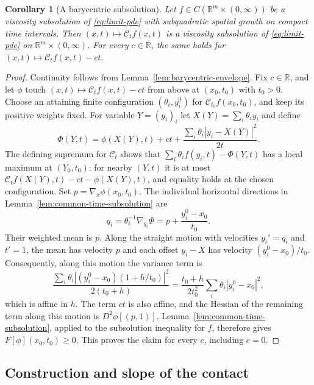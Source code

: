 \documentclass[11pt]{article}
\numberwithin{equation}{section}
\newtheorem{corollary}[theorem]{Corollary}
\theoremstyle{definition}
\theoremstyle{remark}
\newcommand{\R}{\mathbb{R}}
\newcommand{\Cenv}{\mathcal{C}}
\begin{document}
\begin{corollary}[A barycentric subsolution]\label{cor:barycentric-subsolution}
Let $f\in C(\R^m\times(0,\infty))$ be a viscosity subsolution of
\eqref{eq:limit-pde} with subquadratic spatial growth on compact time
intervals. Then $(x,t)\mapsto\Cenv_t f(x,t)$ is a viscosity subsolution of
\eqref{eq:limit-pde} on $\R^m\times(0,\infty)$. For every $c\in\R$, the same
holds for $(x,t)\mapsto\Cenv_t f(x,t)-ct$.
\end{corollary}

\begin{proof}
Continuity follows from Lemma~\ref{lem:barycentric-envelope}. Fix $c\in\R$,
and let $\phi$ touch $(x,t)\mapsto\Cenv_t f(x,t)-ct$ from above at
$(x_0,t_0)$ with $t_0>0$. Choose an attaining finite configuration
$(\theta_i,y_i^0)$ for $\Cenv_{t_0}f(x_0,t_0)$, and keep its positive weights
fixed. For variable $Y=(y_i)_i$ let $X(Y)=\sum_i\theta_i y_i$ and define
\[
  \Phi(Y,t)=\phi(X(Y),t)+ct
              +\frac{\sum_i\theta_i|y_i-X(Y)|^2}{2t}.
\]
The defining supremum for $\Cenv_t$ shows that
$\sum_i\theta_i f(y_i,t)-\Phi(Y,t)$ has a local maximum at $(Y_0,t_0)$:
for nearby $(Y,t)$ it is at most
$\Cenv_t f(X(Y),t)-ct-\phi(X(Y),t)$, and equality holds at the chosen
configuration. Set $p=\nabla_x\phi(x_0,t_0)$. The individual horizontal
directions in Lemma~\ref{lem:common-time-subsolution} are
\[
  q_i=\theta_i^{-1}\nabla_{y_i}\Phi
       =p+\frac{y_i^0-x_0}{t_0}.
\]
Their weighted mean is $p$. Along the straight motion with velocities
$y_i'=q_i$ and $t'=1$, the mean has velocity $p$ and each offset $y_i-X$
has velocity $(y_i^0-x_0)/t_0$. Consequently, along this motion the variance
term is
\[
  \frac{\sum_i\theta_i
           |(y_i^0-x_0)(1+h/t_0)|^2}{2(t_0+h)}
    =\frac{t_0+h}{2t_0^2}
           \sum_i\theta_i|y_i^0-x_0|^2,
\]
which is affine in $h$. The term $ct$ is also affine, and the Hessian of the
remaining term along this motion is $D^2\phi[(p,1)]$.
Lemma~\ref{lem:common-time-subsolution}, applied to the subsolution
inequality for $f$, therefore gives $F[\phi](x_0,t_0)\ge0$. This proves the
claim for every $c$, including $c=0$.
\end{proof}

\subsection{Construction and slope of the contact}
\end{document}
